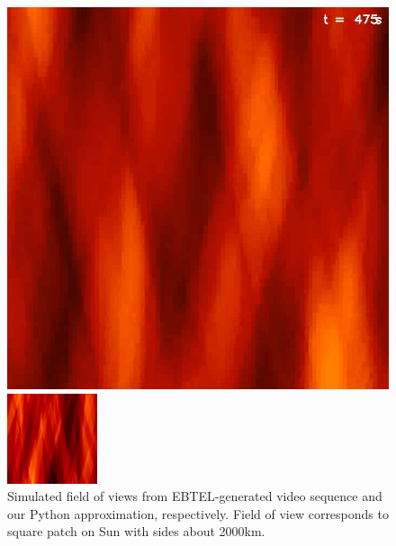 \documentclass[tocnosub,noragright,centerchapter,12pt]{uiucecethesis09}
\begin{document}
\begin{figure}
  \centering
  \begin{minipage}{.5\textwidth}
    \centering
    \includegraphics[width=.8\linewidth]{figures/strands_klimchuk.png}
  \end{minipage}%
  \begin{minipage}{.5\textwidth}
    \centering
    \includegraphics[width=.8\linewidth]{figures/strands_mas.png}
  \end{minipage}
  \caption{Simulated field of views from EBTEL-generated video sequence and our Python approximation, respectively.  Field of view corresponds to square patch on Sun with sides about 2000km.}
  \label{fig:strands}
\end{figure}
\end{document}
